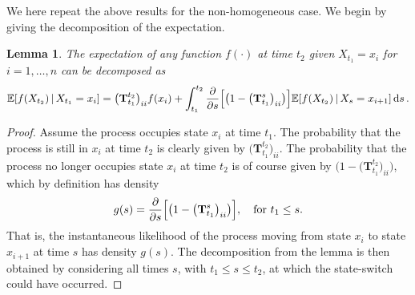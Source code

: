 \documentclass[10pt]{article}
\newtheorem{lemma}[theorem]{Lemma}
\newcommand{\dx}[1][x]{\text{\,d}#1}
\begin{document}
We here repeat the above results for the non-homogeneous case. We begin by giving the decomposition of the expectation.

\begin{lemma}
The expectation of any function $f(\cdot)$ at time $t_2$ given $X_{t_1}=x_i$ for $i=1,\ldots,n$ can be decomposed as
\begin{equation*}
\mathbb{E}[f(X_{t_2})\,\vert\,X_{t_1}=x_i] = \bigl(\mathbf{T}_{t_1}^{t_2}\bigr)_{ii}f(x_i) + \int_{t_1}^{t_2} \frac{\partial}{\partial s}\Bigl[\bigl(1-\bigl(\mathbf{T}_{t_1}^s\bigr)_{ii}\bigr)\Bigr]\mathbb{E}[f(X_{t_2})\,\vert\,X_s=x_{i+1}]\dx[s]\,.
\end{equation*}
\end{lemma}
\begin{proof}
Assume the process occupies state $x_i$ at time $t_1$. The probability that the process is still in $x_i$ at time $t_2$ is clearly given by $\bigl(\mathbf{T}_{t_1}^{t_2}\bigr)_{ii}$. The probability that the process no longer occupies state $x_i$ at time $t_2$ is of course given by $\bigl(1-\bigl(\mathbf{T}_{t_1}^{t_2}\bigr)_{ii}\bigr)$, which by definition has density
\begin{equation*}
g(s) = \frac{\partial}{\partial s}\Bigl[\bigl(1-\bigl(\mathbf{T}_{t_1}^s\bigr)_{ii}\bigr)\Bigr],\quad\text{for $t_1\leq s$}.
\end{equation*}
That is, the instantaneous likelihood of the process moving from state $x_i$ to state $x_{i+1}$ at time $s$ has density $g(s)$.
The decomposition from the lemma is then obtained by considering all times $s$, with $t_1\leq s\leq t_2$, at which the state-switch could have occurred.
\end{proof}
\end{document}
